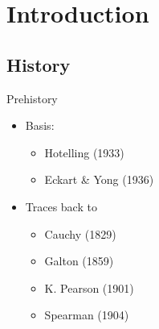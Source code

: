 \documentclass[
  ignorenonframetext,
]{beamer}
\providecommand{\tightlist}{%
  \setlength{\itemsep}{0pt}\setlength{\parskip}{0pt}}
\begin{document}
\hypertarget{introduction}{%
\section{Introduction}\label{introduction}}

\hypertarget{history}{%
\subsection{History}\label{history}}

\begin{frame}{Prehistory}
\protect\hypertarget{prehistory}{}

\begin{itemize}[<+->]
\tightlist
\item
  Basis:

  \begin{itemize}[<+->]
  \tightlist
  \item
    Hotelling (1933)
  \item
    Eckart \& Yong (1936)
  \end{itemize}
\item
  Traces back to

  \begin{itemize}[<+->]
  \tightlist
  \item
    Cauchy (1829)
  \item
    Galton (1859)
  \item
    K. Pearson (1901)
  \item
    Spearman (1904)
  \end{itemize}
\end{itemize}

\end{frame}
\end{document}
